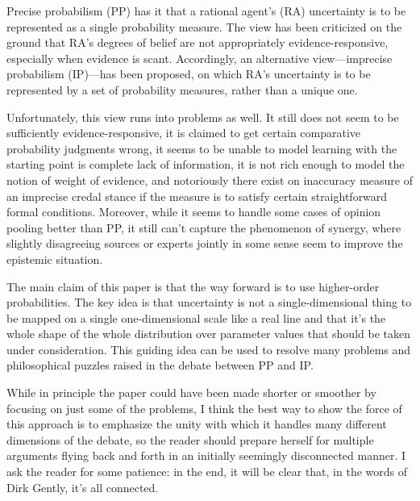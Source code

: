 \documentclass[
  10pt,
  dvipsnames,enabledeprecatedfontcommands]{scrartcl}
\begin{document}
Precise probabilism (PP) has it that a rational agent's (RA) uncertainty
is to be represented as a single probability measure. The view has been
criticized on the ground that RA's degrees of belief are not
appropriately evidence-responsive, especially when evidence is scant.
Accordingly, an alternative view---imprecise probabilism (IP)---has been
proposed, on which RA's uncertainty is to be represented by a set of
probability measures, rather than a unique one.

Unfortunately, this view runs into problems as well. It still does not
seem to be sufficiently evidence-responsive, it is claimed to get
certain comparative probability judgments wrong, it seems to be unable
to model learning with the starting point is complete lack of
information, it is not rich enough to model the notion of weight of
evidence, and notoriously there exist on inaccuracy measure of an
imprecise credal stance if the measure is to satisfy certain
straightforward formal conditions. Moreover, while it seems to handle
some cases of opinion pooling better than PP, it still can't capture the
phenomenon of synergy, where slightly disagreeing sources or experts
jointly in some sense seem to improve the epistemic situation.

The main claim of this paper is that the way forward is to use
higher-order probabilities. The key idea is that uncertainty is not a
single-dimensional thing to be mapped on a single one-dimensional scale
like a real line and that it's the whole shape of the whole distribution
over parameter values that should be taken under consideration. This
guiding idea can be used to resolve many problems and philosophical
puzzles raised in the debate between PP and IP.

While in principle the paper could have been made shorter or smoother by
focusing on just some of the problems, I think the best way to show the
force of this approach is to emphasize the unity with which it handles
many different dimensions of the debate, so the reader should prepare
herself for multiple arguments flying back and forth in an initially
seemingly disconnected manner. I ask the reader for some patience: in
the end, it will be clear that, in the words of Dirk Gently, it's all
connected.
\end{document}
